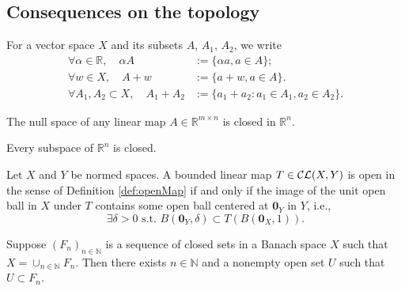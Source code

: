 \subsection{Consequences on the topology}

\begin{ntn}
  \label{ntn:setLinearOpNotation}
  For a vector space $X$ and 
  its subsets $A$, $A_1$, $A_2$, 
  we write
    \begin{displaymath}
      \begin{array}{rl}
        \forall \alpha\in \mathbb{R},
        \quad \alpha A &:= \{\alpha a, a\in A\};
        \\
        \forall w\in X,\quad 
        A + w &:= \{a+w, a\in A\}.
        \\
        \forall A_1, A_2 \subset X,\quad 
        A_1 + A_2 &:= \{a_1+a_2: a_1\in A_1, a_2\in A_2\}.
      \end{array}
  \end{displaymath}
\end{ntn}

\begin{lem}
  \label{lem:KernelIsClosed}
  The null space of any linear map $A\in \mathbb{R}^{m\times n}$
  is closed in $\mathbb{R}^n$.
\end{lem}

\begin{thm}
  \label{thm:finiteDimSubspaceIsClosed}
  Every subspace of $\mathbb{R}^n$ is closed.
\end{thm}

\begin{lem}
  \label{lem:openMapCharInNormedSpaces}
  Let $X$ and $Y$ be normed spaces.
  A bounded linear map $T\in {\cal CL}(X,Y)$ is open
  in the sense of Definition \ref{def:openMap}
  if and only if the image of the unit open ball in $X$ under $T$
  contains some open ball centered at $\mathbf{0}_Y$ in $Y$, i.e.,
  \begin{equation}
    \label{eq:openMapCharInNormedSpaces}
    \exists \delta>0 \text{ s.t. }
    B(\mathbf{0}_Y, \delta) \subset T\left({B(\mathbf{0}_X,1)}\right).
  \end{equation}
\end{lem}

\begin{thm}[Baire]
  \label{thm:Baire}
  Suppose $(F_n)_{n\in \mathbb{N}}$ is a sequence of closed sets
  in a Banach space $X$ such that $X=\cup_{n\in \mathbb{N}} F_n$.
  Then there exists $n\in \mathbb{N}$
  and a nonempty open set $U$ such that $U\subset F_n$.
\end{thm}

